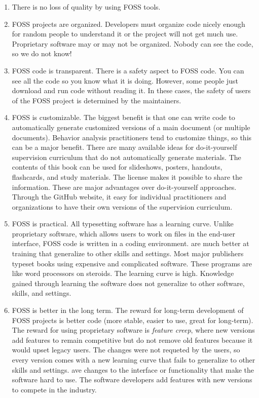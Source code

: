 \begin{enumerate}
\item There is no loss of quality by using FOSS tools. 

\item FOSS projects are organized. Developers must organize code nicely enough for random people to understand it or the project will not get much use. Proprietary software may or may not be organized. Nobody can see the code, so we do not know!

\item FOSS code is transparent. There is a safety aspect to FOSS code. You can see all the code so you know what it is doing. However, some people just download and run code without reading it. In these cases, the safety of users of the FOSS project is determined by the maintainers.
 
\item FOSS is customizable. The biggest benefit is that one can write code to automatically generate customized versions of a main document (or multiple documents). Behavior analysis practitioners tend to customize things, so this can be a major benefit. There are many available ideas for do-it-yourself supervision curriculum that do not automatically generate materials. The contents of this book can be used for slideshows, posters, handouts, flashcards, and study materials. The license makes it possible to share the information. These are major advantages over do-it-yourself approaches. Through the GitHub website, it easy for individual practitioners and organizations to have their own versions of the supervision curriculum. 

\item FOSS is practical. All typesetting software has a learning curve. Unlike proprietary software, which allows users to work on files in the end-user interface, FOSS code is written in a coding environment.  are much better at training  that generalize to other skills and settings. Most major publishers typeset books using expensive and complicated software. These programs are like word processors on steroids. The learning curve is high. Knowledge gained through learning the software does not generalize to other software, skills, and settings. 

\item FOSS is better in the long term. The reward for long-term development of FOSS projects is better code (more stable, easier to use, great for long-term). The reward for using proprietary software is \textit{feature creep}, where new versions add features to remain competitive but do not remove old features because it would upset legacy users. The changes were not requeted by the users, so every version comes with a new learning curve that fails to generalize to other skills and settings. ave changes to the interface or functionality that make the software hard to use. The software developers add features with new versions to compete in the industry. 

\end{enumerate}

